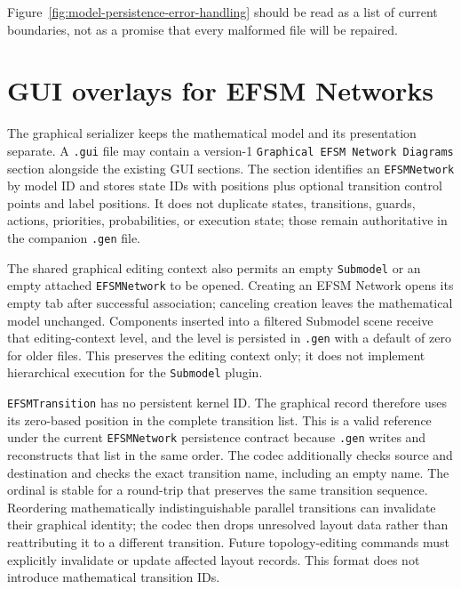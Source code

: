 Figure~\ref{fig:model-persistence-error-handling} should be read as a list of
current boundaries, not as a promise that every malformed file will be repaired.

\section{GUI overlays for EFSM Networks}
\label{sec:model-persistence-efsm-gui-overlay}

The graphical serializer keeps the mathematical model and its presentation
separate. A \texttt{.gui} file may contain a version-1
\texttt{Graphical EFSM Network Diagrams} section alongside the existing GUI
sections. The section identifies an \texttt{EFSMNetwork} by model ID and
stores state IDs with positions plus optional transition control points and
label positions. It does not duplicate states, transitions, guards, actions,
priorities, probabilities, or execution state; those remain authoritative in
the companion \texttt{.gen} file.

The shared graphical editing context also permits an empty \texttt{Submodel} or
an empty attached \texttt{EFSMNetwork} to be opened. Creating an EFSM Network
opens its empty tab after successful association; canceling creation leaves the
mathematical model unchanged. Components inserted into a filtered Submodel scene
receive that editing-context level, and the level is persisted in \texttt{.gen}
with a default of zero for older files. This preserves the editing context only;
it does not implement hierarchical execution for the \texttt{Submodel} plugin.

\texttt{EFSMTransition} has no persistent kernel ID. The graphical record
therefore uses its zero-based position in the complete transition list. This
is a valid reference under the current \texttt{EFSMNetwork} persistence
contract because \texttt{.gen} writes and reconstructs that list in the same
order. The codec additionally checks source and destination and checks the
exact transition name, including an empty name. The ordinal is stable for a
round-trip that preserves the same transition sequence. Reordering
mathematically indistinguishable parallel transitions can invalidate their
graphical identity; the codec then drops unresolved layout data rather than
reattributing it to a different transition. Future topology-editing commands
must explicitly invalidate or update affected layout records. This format
does not introduce mathematical transition IDs.

